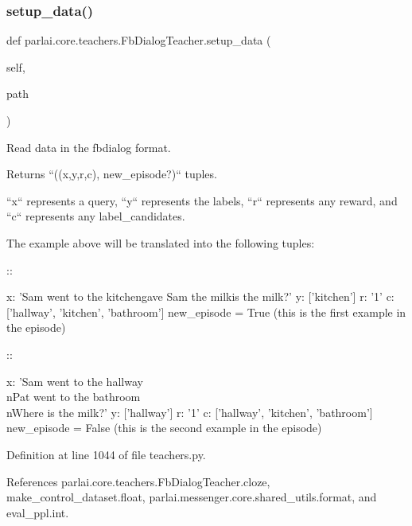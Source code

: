 \subsubsection{\texorpdfstring{setup\+\_\+data()}{setup\_data()}}
{\footnotesize\ttfamily def parlai.\+core.\+teachers.\+Fb\+Dialog\+Teacher.\+setup\+\_\+data (\begin{DoxyParamCaption}\item[{}]{self,  }\item[{}]{path }\end{DoxyParamCaption})}

\begin{DoxyVerb}Read data in the fbdialog format.

Returns ``((x,y,r,c), new_episode?)`` tuples.

``x`` represents a query, ``y`` represents the labels, ``r`` represents
any reward, and ``c`` represents any label_candidates.

The example above will be translated into the following tuples:

::

    x: 'Sam went to the kitchen\nPat gave Sam the milk\nWhere is the milk?'
    y: ['kitchen']
    r: '1'
    c: ['hallway', 'kitchen', 'bathroom']
    new_episode = True (this is the first example in the episode)


::

    x: 'Sam went to the hallway\\nPat went to the bathroom\\nWhere is the
milk?'
    y: ['hallway']
    r: '1'
    c: ['hallway', 'kitchen', 'bathroom']
    new_episode = False (this is the second example in the episode)
\end{DoxyVerb}
 

Definition at line 1044 of file teachers.\+py.



References parlai.\+core.\+teachers.\+Fb\+Dialog\+Teacher.\+cloze, make\+\_\+control\+\_\+dataset.\+float, parlai.\+messenger.\+core.\+shared\+\_\+utils.\+format, and eval\+\_\+ppl.\+int.

\mbox{\label{classparlai_1_1core_1_1teachers_1_1FbDialogTeacher_a18a4ea7a7f21eeed7e087cb447a37c5a}} 
